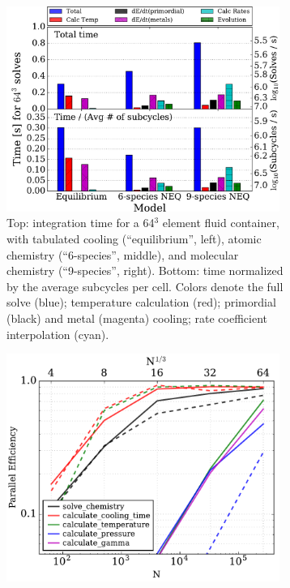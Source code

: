 \begin{figure}[h]
\centering
\begin{subfigure}{.54\textwidth}
  \centering
  \includegraphics[width=0.98\textwidth]{figures/performance.pdf}
  \caption{Top: integration time for a 64$^{3}$
    element fluid container, with tabulated cooling (``equilibrium'',
    left), atomic chemistry (``6-species'', middle), and molecular chemistry
    (``9-species'', right).  Bottom: time normalized by the
    average subcycles per cell.  Colors denote the full solve
    (blue); temperature calculation (red); primordial (black) and metal
    (magenta) cooling; rate coefficient interpolation (cyan).}
  \label{fig:single-proc}
\end{subfigure}%
\hspace{0.02\textwidth}
\begin{subfigure}{.42\textwidth}
  \centering
  \includegraphics[width=0.98\textwidth]{figures/openmp.pdf}

\end{subfigure}
\end{figure}
